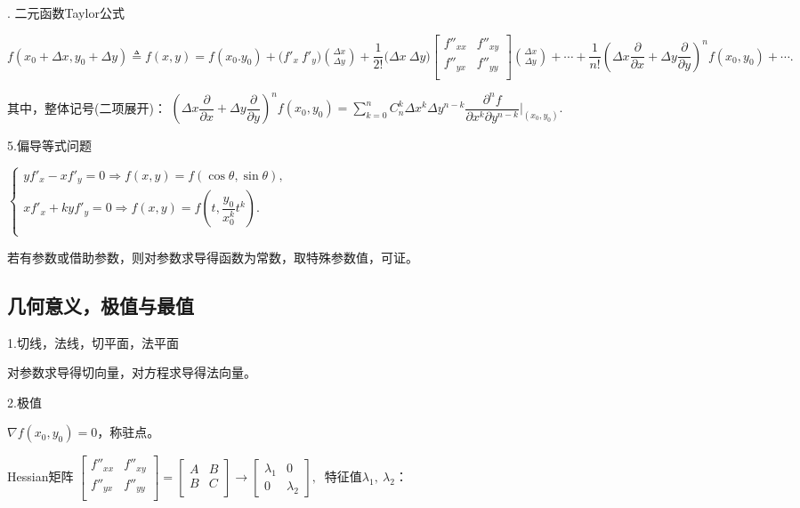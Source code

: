 \documentclass[UTF8]{ctexart}
\numberwithin{equation}{section}
\numberwithin{figure}{section}
\numberwithin{table}{section}
\newcommand\no{\noindent}
\newcommand\dis{\displaystyle}
\newcommand\sumkn{\dis\sum\limits_{k=0}^n}
\begin{document}
\begin{spacing}{2}
\no4. \textcolor[rgb]{1,0,0}{二元函数Taylor公式}

$\dis f(x_0+\Delta x,y_0+\Delta y)\triangleq f(x,y)=
f(x_0.y_0)+\big(f'_x\ f'_y\big)
\binom{\Delta x}{\Delta y}
+\dfrac{1}{2!}\big(\Delta x\ \Delta y\big)
\left[          
  \begin{array}{cc}   
    f''_{xx} & f''_{xy} \\  
    f''_{yx} &f''_{yy} \\  
  \end{array}
\right]               
\binom{\Delta x}{\Delta y}
+\cdots+
\dfrac{1}{n!}\left(\Delta x\dfrac{\partial}{\partial x}
+\Delta y\dfrac{\partial}{\partial y}\right)^nf(x_0,y_0)+\cdots.$

其中，整体记号(二项展开)：
$\left(\Delta x\dfrac{\partial}{\partial x}
+\Delta y\dfrac{\partial}{\partial y}\right)^nf(x_0,y_0)
=\sumkn C_n^k\Delta x^k\Delta y^{n-k}\dfrac{\partial^nf}{\partial x^k\partial y^{n-k}}
\Bigg|_{(x_0,y_0)}.$

\no5.偏导等式问题

\vspace{0.3cm}

$\left\{\begin{aligned}
yf'_x-xf'_y=0\Longrightarrow f(x,y)=f(\cos\theta,\sin\theta),\\
xf'_x+kyf'_y=0\Longrightarrow f(x,y)=f\left(t,\dfrac{y_0}{x_0^k}t^k\right).\\
\end{aligned}\right.$

\vspace{0.3cm}

若有参数或借助参数，则对参数求导得函数为常数，取特殊参数值，可证。

\subsection{几何意义，极值与最值}

\no1.切线，法线，切平面，法平面

对参数求导得切向量，对方程求导得法向量。

\no2.极值

$\nabla f(x_0,y_0)=0$，称驻点。

Hessian矩阵
$\left[          
  \begin{array}{cc}   
    f''_{xx} & f''_{xy} \\  
    f''_{yx} &f''_{yy} \\  
  \end{array}
\right]     
=
\left[          
  \begin{array}{cc}   
    A &B \\  
    B &C \\  
  \end{array}
\right]     
\longrightarrow
\left[          
  \begin{array}{cc}  
\lambda_1&0\\
0&\lambda_2
\end{array}
\right]  
,\ $
特征值$\lambda_1,\ \lambda_2$：


\end{spacing}
\end{document}
